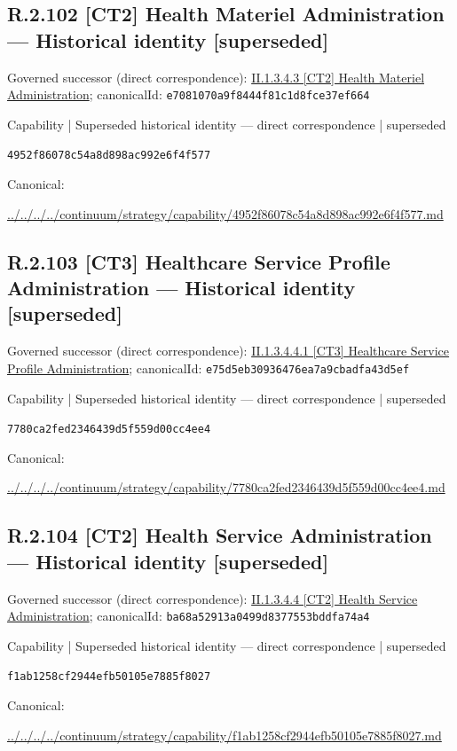 \documentclass[10pt,a4paper]{article}
\begin{document}
\subsection*{R.2.102 [CT2] Health Materiel Administration — Historical identity [superseded]}
Governed successor (direct correspondence): \hyperref[element-e7081070a9f8444f81c1d8fce37ef664]{II.1.3.4.3 [CT2] Health Materiel Administration}; canonicalId: \texttt{e7081070a9f8444f81c1d8fce37ef664}\par
\label{element-4952f86078c54a8d898ac992e6f4f577}
{\small Capability | Superseded historical identity — direct correspondence | superseded}\par
\texttt{4952f86078c54a8d898ac992e6f4f577}\par
Canonical: \par
{\footnotesize\url{../../../../continuum/strategy/capability/4952f86078c54a8d898ac992e6f4f577.md}}\par
\subsection*{R.2.103 [CT3] Healthcare Service Profile Administration — Historical identity [superseded]}
Governed successor (direct correspondence): \hyperref[element-e75d5eb30936476ea7a9cbadfa43d5ef]{II.1.3.4.4.1 [CT3] Healthcare Service Profile Administration}; canonicalId: \texttt{e75d5eb30936476ea7a9cbadfa43d5ef}\par
\label{element-7780ca2fed2346439d5f559d00cc4ee4}
{\small Capability | Superseded historical identity — direct correspondence | superseded}\par
\texttt{7780ca2fed2346439d5f559d00cc4ee4}\par
Canonical: \par
{\footnotesize\url{../../../../continuum/strategy/capability/7780ca2fed2346439d5f559d00cc4ee4.md}}\par
\subsection*{R.2.104 [CT2] Health Service Administration — Historical identity [superseded]}
Governed successor (direct correspondence): \hyperref[element-ba68a52913a0499d8377553bddfa74a4]{II.1.3.4.4 [CT2] Health Service Administration}; canonicalId: \texttt{ba68a52913a0499d8377553bddfa74a4}\par
\label{element-f1ab1258cf2944efb50105e7885f8027}
{\small Capability | Superseded historical identity — direct correspondence | superseded}\par
\texttt{f1ab1258cf2944efb50105e7885f8027}\par
Canonical: \par
{\footnotesize\url{../../../../continuum/strategy/capability/f1ab1258cf2944efb50105e7885f8027.md}}\par
\end{document}
